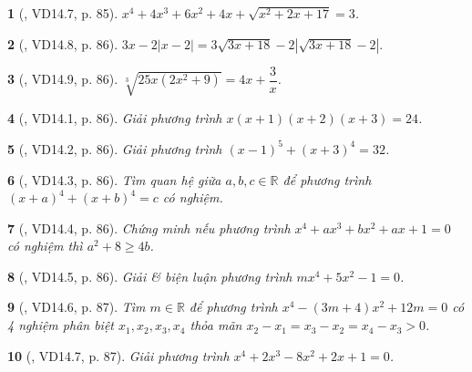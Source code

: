 \documentclass{article}
\newtheorem{baitoan}{}
\begin{document}
\begin{baitoan}[\cite{TLCT_THCS_Toan_9_dai_so}, VD14.7, p. 85]
	$x^4 + 4x^3 + 6x^2 + 4x + \sqrt{x^2 + 2x + 17} = 3$.
\end{baitoan}

\begin{baitoan}[\cite{TLCT_THCS_Toan_9_dai_so}, VD14.8, p. 86]
	$3x - 2|x - 2| = 3\sqrt{3x + 18} - 2|\sqrt{3x + 18} - 2|.$
 \end{baitoan}

\begin{baitoan}[\cite{TLCT_THCS_Toan_9_dai_so}, VD14.9, p. 86]
	$\sqrt[3]{25x(2x^2 + 9)} = 4x + \dfrac{3}{x}$.
\end{baitoan}

\begin{baitoan}[\cite{TLCT_THCS_Toan_9_dai_so}, VD14.1, p. 86]
	Giải phương trình $x(x + 1)(x + 2)(x + 3) = 24$.
\end{baitoan}

\begin{baitoan}[\cite{TLCT_THCS_Toan_9_dai_so}, VD14.2, p. 86]
	Giải phương trình $(x - 1)^5 + (x + 3)^4 = 32$.
\end{baitoan}

\begin{baitoan}[\cite{TLCT_THCS_Toan_9_dai_so}, VD14.3, p. 86]
	Tìm quan hệ giữa $a,b,c\in\mathbb{R}$ để phương trình $(x + a)^4 + (x + b)^4 = c$ có nghiệm.
\end{baitoan}

\begin{baitoan}[\cite{TLCT_THCS_Toan_9_dai_so}, VD14.4, p. 86]
	Chứng minh nếu phương trình $x^4 + ax^3 + bx^2 + ax + 1 = 0$ có nghiệm thì $a^2 + 8\ge4b$.
\end{baitoan}

\begin{baitoan}[\cite{TLCT_THCS_Toan_9_dai_so}, VD14.5, p. 86]
	Giải \& biện luận phương trình $mx^4 + 5x^2 - 1 = 0$.
\end{baitoan}

\begin{baitoan}[\cite{TLCT_THCS_Toan_9_dai_so}, VD14.6, p. 87]
	Tìm $m\in\mathbb{R}$ để phương trình $x^4 - (3m + 4)x^2 + 12m = 0$ có 4 nghiệm phân biệt $x_1,x_2,x_3,x_4$ thỏa mãn $x_2 - x_1 = x_3 - x_2 = x_4 - x_3 > 0$.
\end{baitoan}

\begin{baitoan}[\cite{TLCT_THCS_Toan_9_dai_so}, VD14.7, p. 87]
	Giải phương trình $x^4 + 2x^3 - 8x^2 + 2x + 1 = 0$.
\end{baitoan}
\end{document}
